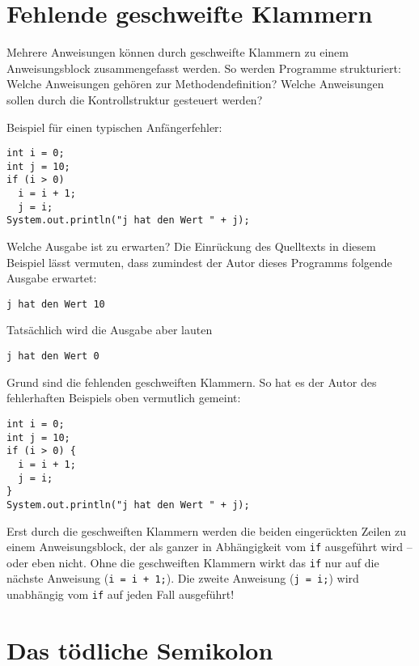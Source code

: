 \section{Fehlende geschweifte Klammern}

Mehrere Anweisungen können durch geschweifte Klammern zu einem Anweisungsblock
zusammengefasst werden. So werden Programme strukturiert: Welche Anweisungen
gehören zur Methodendefinition? Welche Anweisungen sollen durch die
Kontrollstruktur gesteuert werden?

Beispiel für einen typischen Anfängerfehler:

\begin{lstlisting}
int i = 0;
int j = 10;
if (i > 0)
  i = i + 1;
  j = i;
System.out.println("j hat den Wert " + j);
\end{lstlisting}

Welche Ausgabe ist zu erwarten? Die Einrückung des Quelltexts in diesem Beispiel
lässt vermuten, dass zumindest der Autor dieses Programms folgende Ausgabe
erwartet:

\begin{lstlisting}
j hat den Wert 10
\end{lstlisting}

Tatsächlich wird die Ausgabe aber lauten

\begin{lstlisting}
j hat den Wert 0
\end{lstlisting}

Grund sind die fehlenden geschweiften Klammern. So hat es der Autor des
fehlerhaften Beispiels oben vermutlich gemeint:

\begin{lstlisting}
int i = 0;
int j = 10;
if (i > 0) {
  i = i + 1;
  j = i;
}
System.out.println("j hat den Wert " + j);
\end{lstlisting}

Erst durch die geschweiften Klammern werden die beiden eingerückten Zeilen zu
einem Anweisungsblock, der als ganzer in Abhängigkeit vom \lstinline|if|
ausgeführt wird -- oder eben nicht. Ohne die geschweiften Klammern wirkt das
\lstinline|if| nur auf die nächste Anweisung (\lstinline|i = i + 1;|). Die
zweite Anweisung (\lstinline|j = i;|) wird unabhängig vom \lstinline|if| auf jeden Fall
ausgeführt!


\section{Das tödliche Semikolon}

